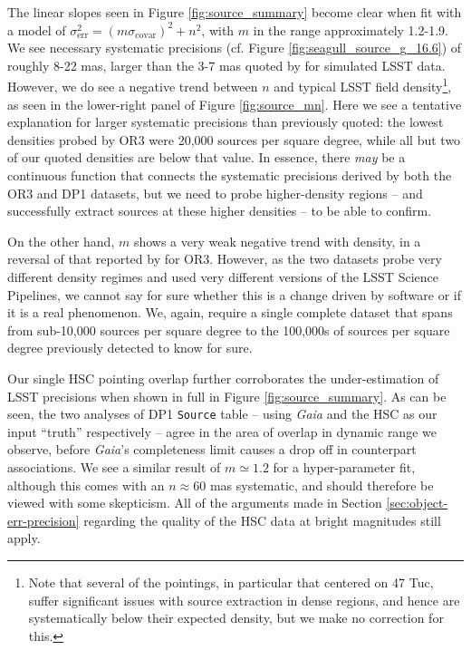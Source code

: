 \documentclass[SE,lsstdraft,authoryear,toc]{lsstdoc}
\begin{document}
The linear slopes seen in Figure \ref{fig:source_summary} become clear when fit with a model of $\sigma_\mathrm{err}^2 = (m\sigma_\mathrm{covar})^2 + n^2$, with $m$ in the range approximately 1.2-1.9.
We see necessary systematic precisions (cf. Figure \ref{fig:seagull_source_g_16.6}) of roughly 8-22 mas, larger than the 3-7 mas quoted by \citet{sitcomtn-159} for simulated LSST data.
However, we do see a negative trend between $n$ and typical LSST field density\footnote{Note that several of the pointings, in particular that centered on 47 Tuc, suffer significant issues with source extraction in dense regions, and hence are systematically below their expected density, but we make no correction for this.}, as seen in the lower-right panel of Figure \ref{fig:source_mn}.
Here we see a tentative explanation for larger systematic precisions than previously quoted: the lowest densities probed by OR3 were 20,000 sources per square degree, while all but two of our quoted densities are below that value.
In essence, there \textit{may} be a continuous function that connects the systematic precisions derived by both the OR3 and DP1 datasets, but we need to probe higher-density regions -- and successfully extract sources at these higher densities -- to be able to confirm.

On the other hand, $m$ shows a very weak negative trend with density, in a reversal of that reported by \citet{sitcomtn-159} for OR3.
However, as the two datasets probe very different density regimes and used very different versions of the LSST Science Pipelines, we cannot say for sure whether this is a change driven by software or if it is a real phenomenon.
We, again, require a single complete dataset that spans from sub-10,000 sources per square degree to the 100,000s of sources per square degree previously detected to know for sure.

Our single HSC pointing overlap further corroborates the under-estimation of LSST precisions when shown in full in Figure \ref{fig:source_summary}.
As can be seen, the two analyses of DP1 \texttt{Source} table -- using \textit{Gaia} and the HSC as our input ``truth'' respectively -- agree in the area of overlap in dynamic range we observe, before \textit{Gaia}'s completeness limit causes a drop off in counterpart associations.
We see a similar result of $m \simeq 1.2$ for a hyper-parameter fit, although this comes with an $n \approx 60$ mas systematic, and should therefore be viewed with some skepticism.
All of the arguments made in Section \ref{sec:object-err-precision} regarding the quality of the HSC data at bright magnitudes still apply.
\end{document}
